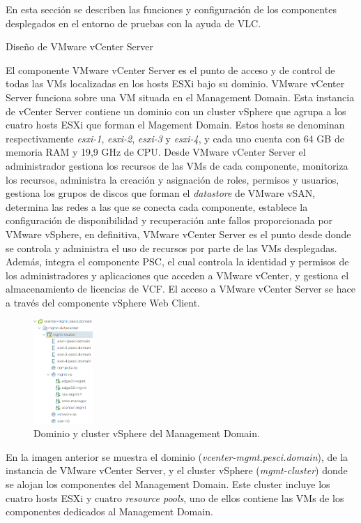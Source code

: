 En esta sección se describen las funciones y configuración de los componentes desplegados en el entorno de pruebas con la ayuda de VLC. 

\begin{subsubsection}{Diseño de VMware vCenter Server}

El componente VMware vCenter Server es el punto de acceso y de control de todas las VMs localizadas en los hosts ESXi bajo su dominio. VMware vCenter Server funciona sobre una VM situada en el Management Domain. Esta instancia de vCenter Server contiene un dominio con un cluster vSphere que agrupa a los cuatro hosts ESXi que forman el Magement Domain. Estos hosts se denominan respectivamente \textit{esxi-1}, \textit{esxi-2}, \textit{esxi-3} y \textit{esxi-4}, y cada uno cuenta con 64 GB de memoria RAM y 19,9 GHz de CPU. Desde VMware vCenter Server el administrador gestiona los recursos de las VMs de cada componente, monitoriza los recursos, administra la creación y asignación de roles, permisos y usuarios, gestiona los grupos de discos que forman el \textit{datastore} de VMware vSAN, determina las redes a las que se conecta cada componente, establece la configuración de disponibilidad y recuperación ante fallos proporcionada por VMware vSphere, en definitiva, VMware vCenter Server es el punto desde donde se controla y administra el uso de recursos por parte de las VMs desplegadas. Además, integra el componente PSC, el cual controla la identidad y permisos de los administradores y aplicaciones que acceden a VMware vCenter, y gestiona el almacenamiento de licencias de VCF. El acceso a VMware vCenter Server se hace a través del componente vSphere Web Client.
\begin{figure}[h]
  \centering
  \includegraphics[width=0.2\textwidth]{imaxes/pruebaconcepto/clusterVCenterServer.png}
  \caption{Dominio y cluster vSphere del Management Domain.}
  \label{fig:cluster-vCenter-Server}
\end{figure}
\FloatBarrier
En la imagen anterior se muestra el dominio (\textit{vcenter-mgmt.pesci.domain}), de la instancia de VMware vCenter Server, y el cluster vSphere (\textit{mgmt-cluster}) donde se alojan los componentes del Management Domain. Este cluster incluye los cuatro hosts ESXi y cuatro \textit{resource pools}, uno de ellos contiene las VMs de los componentes dedicados al Management Domain.

\end{subsubsection}
